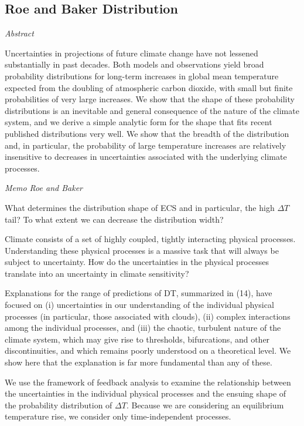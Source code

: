 \documentclass[
]{book}
\begin{document}
\hypertarget{roe-and-baker-distribution}{%
\subsection{Roe and Baker Distribution}\label{roe-and-baker-distribution}}

\emph{Abstract}

Uncertainties in projections of future climate change have not lessened substantially in past
decades. Both models and observations yield broad probability distributions for long-term
increases in global mean temperature expected from the doubling of atmospheric carbon dioxide,
with small but finite probabilities of very large increases. We show that the shape of these
probability distributions is an inevitable and general consequence of the nature of the climate
system, and we derive a simple analytic form for the shape that fits recent published distributions
very well. We show that the breadth of the distribution and, in particular, the probability of
large temperature increases are relatively insensitive to decreases in uncertainties associated with
the underlying climate processes.

\emph{Memo Roe and Baker}

What determines the distribution shape of ECS and in particular, the high \(\Delta T\) tail?
To what extent we can decrease the distribution width?

Climate consists of a set of highly coupled, tightly interacting physical processes.
Understanding these physical processes is a massive
task that will always be subject to uncertainty.
How do the uncertainties in the physical processes translate into an uncertainty in climate
sensitivity?

Explanations for the range of
predictions of DT, summarized in (14), have
focused on
(i) uncertainties in our understanding of the individual physical processes
(in particular, those associated with clouds),
(ii) complex interactions among the individual processes, and
(iii) the chaotic, turbulent nature of the climate system, which may give rise to
thresholds, bifurcations, and other discontinuities, and which
remains poorly understood on a theoretical level.
We show here that the explanation is far more fundamental than any of these.

We use the framework of feedback analysis to examine the relationship between the
uncertainties in the individual physical processes and the ensuing shape of
the probability distribution of \(\Delta T\).
Because we are considering an equilibrium temperature rise, we consider only
time-independent processes.
\end{document}
